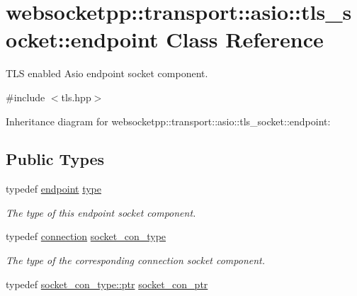 \hypertarget{classwebsocketpp_1_1transport_1_1asio_1_1tls__socket_1_1endpoint}{}\section{websocketpp\+:\+:transport\+:\+:asio\+:\+:tls\+\_\+socket\+:\+:endpoint Class Reference}
\label{classwebsocketpp_1_1transport_1_1asio_1_1tls__socket_1_1endpoint}


T\+LS enabled Asio endpoint socket component.  




{\ttfamily \#include $<$tls.\+hpp$>$}



Inheritance diagram for websocketpp\+:\+:transport\+:\+:asio\+:\+:tls\+\_\+socket\+:\+:endpoint\+:
\subsection*{Public Types}
\begin{DoxyCompactItemize}
\item 
\mbox{\label{classwebsocketpp_1_1transport_1_1asio_1_1tls__socket_1_1endpoint_adc98054310e74703eb102760e85f5cd9}} 
typedef \mbox{\hyperlink{classwebsocketpp_1_1transport_1_1asio_1_1tls__socket_1_1endpoint}{endpoint}} \mbox{\hyperlink{classwebsocketpp_1_1transport_1_1asio_1_1tls__socket_1_1endpoint_adc98054310e74703eb102760e85f5cd9}{type}}
\begin{DoxyCompactList}\small\item\em The type of this endpoint socket component. \end{DoxyCompactList}\item 
\mbox{\label{classwebsocketpp_1_1transport_1_1asio_1_1tls__socket_1_1endpoint_a690393b3da13e389cf025f88a3d38f3f}} 
typedef \mbox{\hyperlink{classwebsocketpp_1_1transport_1_1asio_1_1tls__socket_1_1connection}{connection}} \mbox{\hyperlink{classwebsocketpp_1_1transport_1_1asio_1_1tls__socket_1_1endpoint_a690393b3da13e389cf025f88a3d38f3f}{socket\+\_\+con\+\_\+type}}
\begin{DoxyCompactList}\small\item\em The type of the corresponding connection socket component. \end{DoxyCompactList}\item 
typedef \mbox{\hyperlink{classwebsocketpp_1_1transport_1_1asio_1_1tls__socket_1_1connection_a2aa605c27a476eba644e062dc5bc4f6d}{socket\+\_\+con\+\_\+type\+::ptr}} \mbox{\hyperlink{classwebsocketpp_1_1transport_1_1asio_1_1tls__socket_1_1endpoint_ad0babd14e53524633840467d072710c3}{socket\+\_\+con\+\_\+ptr}}
\end{DoxyCompactItemize}
